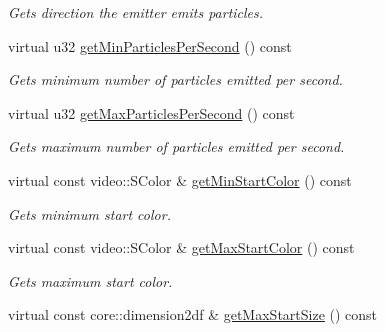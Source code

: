 \begin{DoxyCompactItemize}
\begin{DoxyCompactList}\small\item\em Gets direction the emitter emits particles. \end{DoxyCompactList}\item 
\hypertarget{classirr_1_1scene_1_1_c_particle_box_emitter_a212da0aeae2145986718919c218042fd}{virtual u32 \hyperlink{classirr_1_1scene_1_1_c_particle_box_emitter_a212da0aeae2145986718919c218042fd}{get\-Min\-Particles\-Per\-Second} () const }\label{classirr_1_1scene_1_1_c_particle_box_emitter_a212da0aeae2145986718919c218042fd}

\begin{DoxyCompactList}\small\item\em Gets minimum number of particles emitted per second. \end{DoxyCompactList}\item 
\hypertarget{classirr_1_1scene_1_1_c_particle_box_emitter_aa3e73227ac1f85b2671bc49f04f71c60}{virtual u32 \hyperlink{classirr_1_1scene_1_1_c_particle_box_emitter_aa3e73227ac1f85b2671bc49f04f71c60}{get\-Max\-Particles\-Per\-Second} () const }\label{classirr_1_1scene_1_1_c_particle_box_emitter_aa3e73227ac1f85b2671bc49f04f71c60}

\begin{DoxyCompactList}\small\item\em Gets maximum number of particles emitted per second. \end{DoxyCompactList}\item 
\hypertarget{classirr_1_1scene_1_1_c_particle_box_emitter_a09ebdc14d1dd95555a5d475e001cb408}{virtual const video\-::\-S\-Color \& \hyperlink{classirr_1_1scene_1_1_c_particle_box_emitter_a09ebdc14d1dd95555a5d475e001cb408}{get\-Min\-Start\-Color} () const }\label{classirr_1_1scene_1_1_c_particle_box_emitter_a09ebdc14d1dd95555a5d475e001cb408}

\begin{DoxyCompactList}\small\item\em Gets minimum start color. \end{DoxyCompactList}\item 
\hypertarget{classirr_1_1scene_1_1_c_particle_box_emitter_a7a4ae893b38b2761de7d2db370dbf5a0}{virtual const video\-::\-S\-Color \& \hyperlink{classirr_1_1scene_1_1_c_particle_box_emitter_a7a4ae893b38b2761de7d2db370dbf5a0}{get\-Max\-Start\-Color} () const }\label{classirr_1_1scene_1_1_c_particle_box_emitter_a7a4ae893b38b2761de7d2db370dbf5a0}

\begin{DoxyCompactList}\small\item\em Gets maximum start color. \end{DoxyCompactList}\item 
\hypertarget{classirr_1_1scene_1_1_c_particle_box_emitter_add7d33f71aa4f021a1173f04ec20c37f}{virtual const core\-::dimension2df \& \hyperlink{classirr_1_1scene_1_1_c_particle_box_emitter_add7d33f71aa4f021a1173f04ec20c37f}{get\-Max\-Start\-Size} () const }\label{classirr_1_1scene_1_1_c_particle_box_emitter_add7d33f71aa4f021a1173f04ec20c37f}


\end{DoxyCompactItemize}
